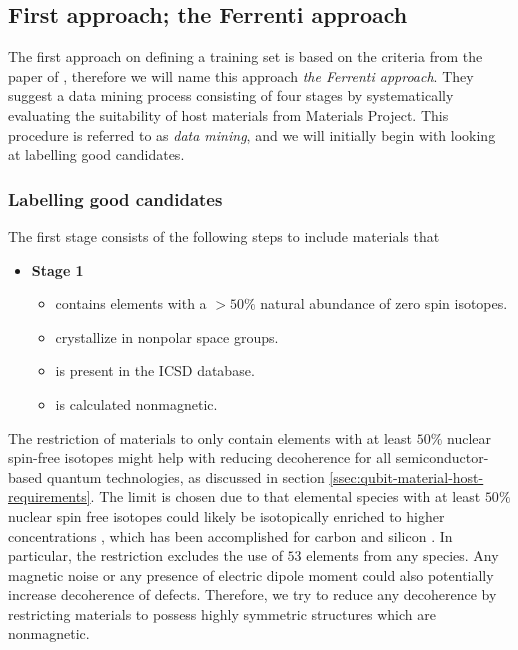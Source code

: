 \subsection{First approach; the Ferrenti approach}

The first approach on defining a training set is based on the criteria from the paper  of \citeauthor{Ferrenti2020} \cite{Ferrenti2020}, therefore we will name this approach \textit{the Ferrenti approach}. They suggest a data mining process consisting of four stages by systematically evaluating the suitability of host materials from Materials Project. This procedure is referred to as \textit{data mining}, and we will initially begin with looking at labelling good candidates.

\subsubsection{Labelling good candidates}

The first stage consists of the following steps to include materials that
\begin{itemize}
  \item[]{\textbf{Stage 1}}
  \begin{itemize}
  \item contains elements with a $>50\%$ natural abundance of zero spin isotopes.
  \item crystallize in nonpolar space groups.
  \item is present in the ICSD database.
  \item is calculated nonmagnetic.
  \end{itemize}
\end{itemize}

\noindent The restriction of materials to only contain elements with at least $50\%$ nuclear spin-free isotopes might help with reducing decoherence for all semiconductor-based quantum technologies, as discussed in section \ref{ssec:qubit-material-host-requirements}. The limit is chosen due to that elemental species with at least $50\%$ nuclear spin free isotopes could likely be isotopically enriched to higher concentrations \cite{Ferrenti2020}, which has been accomplished for carbon \cite{Markham2011, Balasubramanian2009} and silicon \cite{Tyryshkin2011}. In particular, the restriction excludes the use of $53$ elements from any species. Any magnetic noise or any presence of electric dipole moment could also potentially increase decoherence of defects. Therefore, we try to reduce any decoherence by restricting materials to possess highly symmetric structures which are nonmagnetic.

